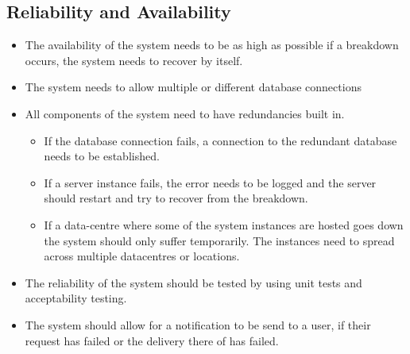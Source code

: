 \documentclass[a4paper,12pt]{article}
\begin{document}
\subsection{Reliability and Availability}
\begin{itemize}
	\item The availability of the system needs to be as high as possible if a breakdown occurs, the system needs to recover by itself. 
	\item The system needs to allow multiple or different database connections
	\item All components of the system need to have redundancies built in.
	\begin{itemize}
		\item If the database connection fails, a connection to the redundant database needs to be established. 
		\item If a server instance fails, the error needs to be logged and the server should restart and try to recover from the breakdown. 
		\item If a data-centre where some of the system instances are hosted goes down the system should only suffer temporarily. The instances need to spread across multiple datacentres or locations. 
	\end{itemize}
	\item The reliability of the system should be tested by using unit tests and acceptability testing.
	\item The system should allow for a notification to be send to a user, if their request has failed or the delivery there of has failed. 
\end{itemize}
\end{document}
